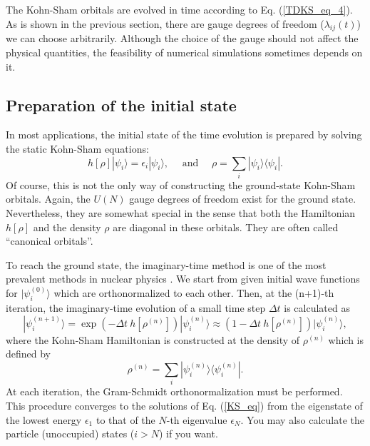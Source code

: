 \documentclass[twoside]{article}
\newcommand{\bra}[1]{\langle {#1} |}
\newcommand{\ket}[1]{| {#1} \rangle}
\begin{document}
{The Kohn-Sham orbitals are evolved in time according to Eq. (\ref{TDKS_eq_4}).
As is shown in the previous section, there are gauge degrees of freedom
($\lambda_{ij}(t)$) we can choose arbitrarily.
Although the choice of the gauge should not affect the physical quantities,
the feasibility of numerical simulations sometimes depends on it.

\subsection{Preparation of the initial state}

In most applications, the initial state of the time evolution is
prepared by solving the static Kohn-Sham equations:
\begin{equation}
\label{KS_eq}
h[\rho] \ket{\psi_i} = \epsilon_i \ket{\psi_i} ,\quad
\textrm{ and } \quad
\rho=\sum_i \ket{\psi_i}\bra{\psi_i} .
\end{equation}
Of course, this is not the only way of constructing the ground-state
Kohn-Sham orbitals.
Again, the $U(N)$ gauge degrees of freedom exist for the ground state.
Nevertheless, they are somewhat special in the sense that
both the Hamiltonian $h[\rho]$ and the density $\rho$ are
diagonal in these orbitals.
They are often called ``canonical orbitals''.

To reach the ground state, the imaginary-time method is one of the
most prevalent methods in nuclear physics \cite{DFKW80}.
We start from given initial wave functions for $\ket{\psi_i^{(0)}}$
which are orthonormalized to each other.
Then, at the (n+1)-th iteration, 
the imaginary-time evolution of a small time step $\Delta t$
is calculated as
\begin{equation}
\ket{\psi_i^{(n+1)}}= \exp(-\Delta t \ h[\rho^{(n)}]) \ket{\psi_i^{(n)}}
\approx \left( 1 - \Delta t \ h[\rho^{(n)}] \right) \ket{\psi_i^{(n)}} ,
\end{equation}
where the Kohn-Sham Hamiltonian is constructed at the density of
$\rho^{(n)}$ which is defined by
\begin{equation}
\rho^{(n)} = \sum_i \ket{\psi_i^{(n)}} \bra{\psi_i^{(n)}} .
\end{equation}
At each iteration, the Gram-Schmidt orthonormalization must be performed.
This procedure converges to the solutions of Eq. (\ref{KS_eq}) from
the eigenstate of the lowest energy $\epsilon_1$ to
that of the $N$-th eigenvalue $\epsilon_N$.
You may also calculate the particle (unoccupied) states ($i>N$)
if you want.

}
\end{document}
